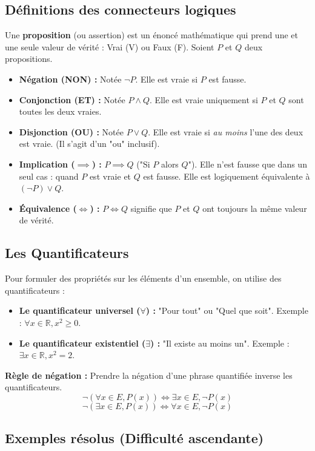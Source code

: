 \documentclass[12pt,a4paper]{report}
\begin{document}
\subsection{Définitions des connecteurs logiques}
Une \textbf{proposition} (ou assertion) est un énoncé mathématique qui prend une et une seule valeur de vérité : Vrai (V) ou Faux (F).
Soient $P$ et $Q$ deux propositions.

\begin{itemize}
    \item \textbf{Négation (NON) :} Notée $\neg P$. Elle est vraie si $P$ est fausse.
    \item \textbf{Conjonction (ET) :} Notée $P \land Q$. Elle est vraie uniquement si $P$ et $Q$ sont toutes les deux vraies.
    \item \textbf{Disjonction (OU) :} Notée $P \lor Q$. Elle est vraie si \textit{au moins} l'une des deux est vraie. (Il s'agit d'un "ou" inclusif).
    \item \textbf{Implication ($\implies$) :} $P \implies Q$ ("Si $P$ alors $Q$"). Elle n'est fausse que dans un seul cas : quand $P$ est vraie et $Q$ est fausse. Elle est logiquement équivalente à $(\neg P) \lor Q$.
    \item \textbf{Équivalence ($\iff$) :} $P \iff Q$ signifie que $P$ et $Q$ ont toujours la même valeur de vérité.
\end{itemize}



\subsection{Les Quantificateurs}
Pour formuler des propriétés sur les éléments d'un ensemble, on utilise des quantificateurs :
\begin{itemize}
    \item \textbf{Le quantificateur universel ($\forall$) :} "Pour tout" ou "Quel que soit". Exemple : $\forall x \in \mathbb{R}, x^2 \ge 0$.
    \item \textbf{Le quantificateur existentiel ($\exists$) :} "Il existe au moins un". Exemple : $\exists x \in \mathbb{R}, x^2 = 2$.
\end{itemize}

\textbf{Règle de négation :} Prendre la négation d'une phrase quantifiée inverse les quantificateurs.
$$ \neg (\forall x \in E, P(x)) \iff \exists x \in E, \neg P(x) $$
$$ \neg (\exists x \in E, P(x)) \iff \forall x \in E, \neg P(x) $$

\subsection{Exemples résolus (Difficulté ascendante)}
\end{document}
